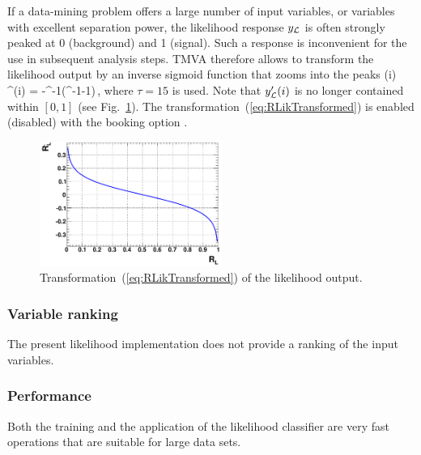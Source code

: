 If a data-mining problem offers a large number of input variables, or 
variables with excellent separation power, the likelihood response $\RLik$ 
is often strongly peaked at 0 (background) and 1 (signal). Such a response
is inconvenient for the use in subsequent analysis steps. TMVA therefore 
allows to transform the likelihood output by an inverse sigmoid function
that zooms into the peaks
\beq
\label{eq:RLikTransformed}
		\RLik(i) \longrightarrow \RLik^\prime(i) = 
		-\tau^{-1}\ln\!\left(\RLik^{-1}-1\right)\,,
\eeq
where $\tau=15$ is used. Note that $\RLik^\prime(i)$ is no 
longer contained within $[0,1]$ (see Fig.~\ref{fig:liktransform}).
The transformation~(\ref{eq:RLikTransformed}) is enabled (disabled) with 
the booking option . 
\begin{figure}[t]
  \begin{center}
	  \includegraphics[width=0.53\textwidth]{plots/liktransform}
  \end{center}
  \vspace{-0.5cm}
  \caption[.]{Transformation~(\ref{eq:RLikTransformed}) of the likelihood output. }
\label{fig:liktransform}
\end{figure}

\subsubsection{Variable ranking}

The present likelihood implementation does not provide a ranking of 
the input variables.

\subsubsection{Performance}

Both the training and the application of the likelihood 
classifier are very fast operations that are suitable for large data sets. 

